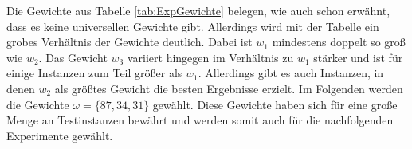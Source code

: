 \documentclass[german,version-2019-11]{uzl-thesis}
\begin{document}
Die Gewichte aus Tabelle \ref{tab:ExpGewichte} belegen, wie auch schon erwähnt, dass es keine universellen Gewichte gibt. Allerdings wird mit der Tabelle ein grobes Verhältnis der Gewichte deutlich. Dabei ist $w_1$ mindestens doppelt so groß wie $w_2$. Das Gewicht $w_3$ variiert hingegen im Verhältnis zu $w_1$ stärker und ist für einige Instanzen zum Teil größer als $w_1$. Allerdings gibt es auch Instanzen, in denen $w_2$ als größtes Gewicht die besten Ergebnisse erzielt. Im Folgenden werden die Gewichte $\omega = \{87,34,31\}$ gewählt. Diese Gewichte haben sich für eine große Menge an Testinstanzen bewährt und werden somit auch für die nachfolgenden Experimente gewählt. \\~\\

\begin{table}[htpb]
\centering
{}
\caption{Der jeweils beste Gewichte-Kandidat von $1.000$ zufälligen Gewichten für $100$ zufällige Instanzen.}
\label{tab:ExpGewichte}
\end{table} 
\newpage
\end{document}
